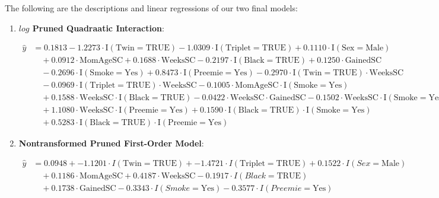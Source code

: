 \documentclass{article}\usepackage[]{graphicx}\usepackage[]{xcolor}
\begin{document}
The following are the descriptions and linear regressions of our two final models:
\begin{enumerate} %

\item \textbf{$log$ Pruned Quadraatic Interaction}:

\begin{align*}
\hat{y} &= 0.1813 - 1.2273\cdot \text{I}(\text{Twin} = \text{TRUE}) - 1.0309\cdot \text{I}(\text{Triplet} = \text{TRUE}) + 0.1110\cdot \text{I}(\text{Sex} = \text{Male}) \\
&\quad + 0.0912\cdot \text{MomAgeSC} + 0.1688\cdot \text{WeeksSC} - 0.2197\cdot \text{I}(\text{Black} = \text{TRUE}) + 0.1250\cdot \text{GainedSC} \\
&\quad - 0.2696\cdot \text{I}(\text{Smoke} = \text{Yes}) + 0.8473\cdot \text{I}(\text{Preemie} = \text{Yes}) - 0.2970\cdot \text{I}(\text{Twin} = \text{TRUE})\cdot \text{WeeksSC} \\
&\quad - 0.0969\cdot \text{I}(\text{Triplet} = \text{TRUE})\cdot \text{WeeksSC} - 0.1005\cdot \text{MomAgeSC}\cdot \text{I}(\text{Smoke} = \text{Yes}) \\ 
&\quad + 0.1588\cdot \text{WeeksSC}\cdot \text{I}(\text{Black} = \text{TRUE}) - 0.0422\cdot \text{WeeksSC}\cdot \text{GainedSC} - 0.1502\cdot \text{WeeksSC}\cdot \text{I}(\text{Smoke} = \text{Yes}) \\
&\quad + 1.1080\cdot \text{WeeksSC}\cdot \text{I}(\text{Preemie} = \text{Yes}) + 0.1590\cdot \text{I}(\text{Black} = \text{TRUE})\cdot \text{I}(\text{Smoke} = \text{Yes}) \\
&\quad + 0.5283\cdot \text{I}(\text{Black} = \text{TRUE})\cdot \text{I}(\text{Preemie} = \text{Yes})
\end{align*}



\item \textbf{Nontransformed Pruned First-Order Model}:

\begin{align*}
\hat{y} &= 0.0948 + -1.1201\cdot I(\text{Twin} = \text{TRUE}) + -1.4721\cdot I(\text{Triplet} = \text{TRUE}) + 0.1522\cdot I(Sex = \text{Male}) \\ &\quad + 0.1186\cdot \text{MomAgeSC} + 0.4187\cdot \text{WeeksSC} - 0.1917\cdot I(Black = \text{TRUE}) \\ &\quad + 0.1738\cdot \text{GainedSC} - 0.3343\cdot I(Smoke = \text{Yes}) - 0.3577\cdot I(Preemie = \text{Yes})
\end{align*}

\end{enumerate} %
\end{document}

